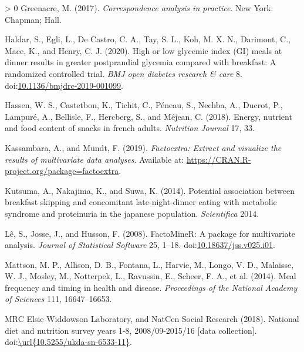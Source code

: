 \documentclass[utf8]{frontiersSCNS}
\newlength{\cslhangindent}
\newenvironment{CSLReferences}[3] %
 {%
  \setlength{\parindent}{0pt}
  \ifodd #1 \everypar{\setlength{\hangindent}{\cslhangindent}}\ignorespaces\fi
  \ifnum #2 > 0
  \setlength{\parskip}{#2\baselineskip}
  \fi
 }%
 {}
\begin{document}
\begin{CSLReferences}{1}{0}
\leavevmode\hypertarget{ref-greenacre2017correspondence}{}%
Greenacre, M. (2017). \emph{Correspondence analysis in practice}. New
York: Chapman; Hall.

\leavevmode\hypertarget{ref-Haldar2020}{}%
Haldar, S., Egli, L., De Castro, C. A., Tay, S. L., Koh, M. X. N.,
Darimont, C., Mace, K., and Henry, C. J. (2020). High or low glycemic
index (GI) meals at dinner results in greater postprandial glycemia
compared with breakfast: A randomized controlled trial. \emph{BMJ open
diabetes research \& care} 8.
doi:\href{https://doi.org/10.1136/bmjdrc-2019-001099}{10.1136/bmjdrc-2019-001099}.

\leavevmode\hypertarget{ref-Hassen2018}{}%
Hassen, W. S., Castetbon, K., Tichit, C., Péneau, S., Nechba, A.,
Ducrot, P., Lampuré, A., Bellisle, F., Hercberg, S., and Méjean, C.
(2018). Energy, nutrient and food content of snacks in french adults.
\emph{Nutrition Journal} 17, 33.

\leavevmode\hypertarget{ref-factoextra}{}%
Kassambara, A., and Mundt, F. (2019). \emph{Factoextra: Extract and
visualize the results of multivariate data analyses}. Available at:
\url{https://CRAN.R-project.org/package=factoextra}.

\leavevmode\hypertarget{ref-kutsuma2014potential}{}%
Kutsuma, A., Nakajima, K., and Suwa, K. (2014). Potential association
between breakfast skipping and concomitant late-night-dinner eating with
metabolic syndrome and proteinuria in the japanese population.
\emph{Scientifica} 2014.

\leavevmode\hypertarget{ref-L__2008}{}%
Lê, S., Josse, J., and Husson, F. (2008). {FactoMineR}: A package for
multivariate analysis. \emph{Journal of Statistical Software} 25, 1--18.
doi:\href{https://doi.org/10.18637/jss.v025.i01}{10.18637/jss.v025.i01}.

\leavevmode\hypertarget{ref-mattson2014meal}{}%
Mattson, M. P., Allison, D. B., Fontana, L., Harvie, M., Longo, V. D.,
Malaisse, W. J., Mosley, M., Notterpek, L., Ravussin, E., Scheer, F. A.,
et al. (2014). Meal frequency and timing in health and disease.
\emph{Proceedings of the National Academy of Sciences} 111,
16647--16653.

\leavevmode\hypertarget{ref-MRCElsieWiddowsonLaboratory2018}{}%
MRC Elsie Widdowson Laboratory, and NatCen Social Research (2018).
National diet and nutrition survey years 1-8, 2008/09-2015/16 {[}data
collection{]}.
doi:\href{https://doi.org//url\%7B10.5255/ukda-sn-6533-11\%7D}{\textbackslash url\{10.5255/ukda-sn-6533-11\}}.


\end{CSLReferences}
\end{document}
